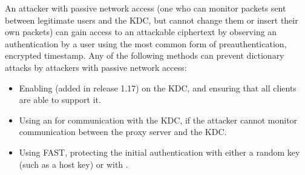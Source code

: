 \documentclass[letterpaper,10pt,english]{sphinxmanual}
\begin{document}
\begin{sphinxVerbatim}[commandchars=\\\{\}]
    
\end{sphinxVerbatim}

\sphinxAtStartPar
An attacker with passive network access (one who can monitor packets
sent between legitimate users and the KDC, but cannot change them or
insert their own packets) can gain access to an attackable ciphertext
by observing an authentication by a user using the most common form of
preauthentication, encrypted timestamp.  Any of the following methods
can prevent dictionary attacks by attackers with passive network
access:
\begin{itemize}
\item {} 
\sphinxAtStartPar
Enabling {\hyperref[\detokenize{admin/spake:spake}]{}} (added in release
1.17) on the KDC, and ensuring that all clients are able to support
it.

\item {} 
\sphinxAtStartPar
Using an {\hyperref[\detokenize{admin/https:https}]{}} for communication with the KDC,
if the attacker cannot monitor communication between the proxy
server and the KDC.

\item {} 
\sphinxAtStartPar
Using FAST, protecting the initial authentication with either a
random key (such as a host key) or with {\hyperref[\detokenize{admin/pkinit:anonymous-pkinit}]{}}.

\end{itemize}
\end{document}
